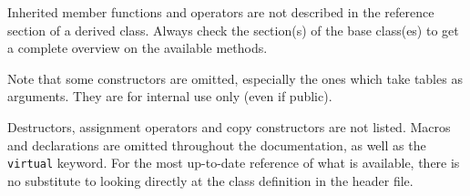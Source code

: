 Inherited member functions and operators are not described in the
reference section of a derived class. Always check the section(s)
of the base class(es) to get a complete overview on the available
methods.

Note that some constructors are omitted, especially the ones which
take tables as arguments. They are for internal use only (even if
public).

Destructors, assignment operators and copy constructors are not
listed.  Macros and  declarations are omitted throughout the
documentation, as well as the {\tt virtual} keyword.  For the
most up-to-date reference of what is available, there is no
substitute to looking directly at the class definition in
the header file.

\clearpage


%
%
